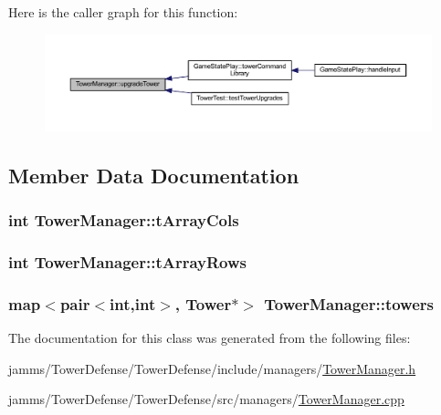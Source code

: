 Here is the caller graph for this function\+:\nopagebreak
\begin{figure}[H]
\begin{center}
\leavevmode
\includegraphics[width=350pt]{class_tower_manager_aa74345499b531c211c0abf7b91eb96fc_icgraph}
\end{center}
\end{figure}




\subsection{Member Data Documentation}
\hypertarget{class_tower_manager_a5c5df568b2ea8dd7220fed1d850c4050}{
\subsubsection[{t\+Array\+Cols}]{\setlength{\rightskip}{0pt plus 5cm}int Tower\+Manager\+::t\+Array\+Cols}}\label{class_tower_manager_a5c5df568b2ea8dd7220fed1d850c4050}
\hypertarget{class_tower_manager_a11ff48fe3d8fbaaeb2b0380893c35990}{
\subsubsection[{t\+Array\+Rows}]{\setlength{\rightskip}{0pt plus 5cm}int Tower\+Manager\+::t\+Array\+Rows}}\label{class_tower_manager_a11ff48fe3d8fbaaeb2b0380893c35990}
\hypertarget{class_tower_manager_aff1fd2b7123af1d48255ee4dfe19c637}{
\subsubsection[{towers}]{\setlength{\rightskip}{0pt plus 5cm}map$<$pair$<$int,int$>$, {\bf Tower}$\ast$$>$ Tower\+Manager\+::towers\hspace{0.3cm}{\ttfamily [private]}}}\label{class_tower_manager_aff1fd2b7123af1d48255ee4dfe19c637}


The documentation for this class was generated from the following files\+:\begin{DoxyCompactItemize}
\item 
jamms/\+Tower\+Defense/\+Tower\+Defense/include/managers/\hyperlink{_tower_manager_8h}{Tower\+Manager.\+h}\item 
jamms/\+Tower\+Defense/\+Tower\+Defense/src/managers/\hyperlink{_tower_manager_8cpp}{Tower\+Manager.\+cpp}\end{DoxyCompactItemize}
